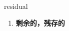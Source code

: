 
\begin{frame}
{\huge residual}
\begin{center}
\begin{enumerate}\Large
  \item \textbf{剩余的，残存的}
\end{enumerate}
\end{center}
\end{frame}

